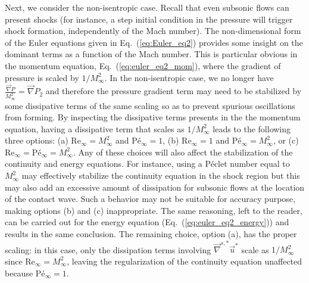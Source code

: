 \documentclass[review,10pt]{elsarticle}
\newcommand{\grad}{\vec{\nabla}}
\newcommand{\gradd}[1]{\vec{\nabla}^{#1}}
\renewcommand{\Re}{\textrm{Re}}
\newcommand{\Pe}{\textrm{P\'e}}
\renewcommand{\Pr}{\textrm{Pr}}
\newcommand{\eqt}[1]{Eq.~(\ref{#1})}                     %
\begin{document}
Next, we consider the non-isentropic case. Recall that even subsonic flows can present shocks (for instance, 
a step initial condition in the pressure will trigger shock formation, independently of the Mach number). 
The non-dimensional form of the Euler equations given in \eqt{eq:Euler_eq2} provides some insight on the 
dominant terms as a function of the Mach number. This is particular obvious in the momentum equation, \eqt{eq:euler_eq2_mom}, 
where the gradient of pressure is scaled by $1/M_\infty^2$. In the non-isentropic case, we no longer 
have $\frac{\grad P}{M_\infty^2}=\grad P_2$ and therefore the pressure gradient term may need to be stabilized by 
some dissipative terms of the same scaling so as to prevent spurious oscillations from forming. 
By inspecting the dissipative terms presents in the the momentum equation, having a dissipative term that 
scales as $1/M_\infty^2$ leads to the following three options: 
(a) $\Re_\infty = M_\infty^2$ and $\Pe_\infty = 1$,
(b) $\Re_\infty = 1$ and $\Pe_\infty = M_\infty^2$, or
(c) $\Re_\infty = \Pe_\infty = M_\infty^2$. 
%
Any of these choices will also affect the stabilization of the continuity and energy equations. 
For instance, using a P\'eclet number equal to $M_\infty^2$ may effectively stabilize the continuity 
equation in the shock region but this may also add an excessive amount of dissipation for subsonic 
flows at the location of the contact wave. Such a behavior may not be suitable for accuracy purpose, 
making options (b) and (c) inappropriate. The same reasoning, left to the reader, can be carried out 
for the energy equation (\eqt{eq:euler_eq2_energy}) and results in the same conclusion. The remaining 
choice, option (a), has the proper scaling: in this case, only the dissipation terms involving 
$\gradd{s,*} \vec{u}^*$ scale as $1/M_\infty^2$ since $\Re_\infty = M_\infty^2$, leaving the 
regularization of the continuity equation unaffected because $\Pe_\infty = 1$.
%
%
\end{document}
